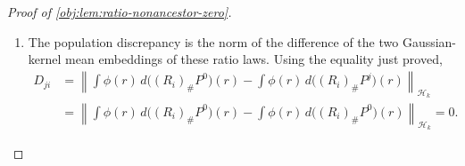 \begin{proof}[Proof of \cref{obj:lem:ratio-nonancestor-zero}]
\begin{enumerate}
\[
\int_{[0,1]^{[n]\setminus\mathcal A_i}}
\Gamma_i^0(\mathfrak a,\mathfrak b)\,d\mathfrak b=1,
\qquad
\int_{[0,1]^{[n]\setminus\mathcal A_i}}
\Gamma_i^j(\mathfrak a,\mathfrak b)\,d\mathfrak b=1 .
\]
Consequently the two complement-marginal densities on \([0,1]^{\mathcal A_i}\) are the same:
\[
\int_{[0,1]^{[n]\setminus\mathcal A_i}}
p^0(\mathfrak a\oplus\mathfrak b)\,d\mathfrak b
=
\prod_{\ell\in\mathcal A_i}
 p_\ell\bigl(\mathfrak a_\ell\mid
 \mathfrak a_{\operatorname{pa}_G(\ell)}\bigr)
=
\int_{[0,1]^{[n]\setminus\mathcal A_i}}
p^{\pi(j)}(\mathfrak a\oplus\mathfrak b)\,d\mathfrak b .
\]
Thus the projected latent laws agree:
\[
(\operatorname{pr}_{\mathcal A_i})_\#\mu^0
=
(\operatorname{pr}_{\mathcal A_i})_\#\mu^{\pi(j)} .
\]
Since \(\{\pi(i)\}\cup\operatorname{pa}_G(\pi(i))\subseteq\mathcal A_i\), the ratio map \(\rho_i\) factors through this projection.  Explicitly, the map \(\widetilde\rho_i:[0,1]^{\mathcal A_i}\to\mathbb R\) defined by
\[
\widetilde\rho_i(\mathfrak a)
=
\frac{q_{\pi(i)}(\mathfrak a_{\pi(i)})}
{p_{\pi(i)}(\mathfrak a_{\pi(i)}\mid
\mathfrak a_{\operatorname{pa}_G(\pi(i))})}
\]
satisfies \(\rho_i=\widetilde\rho_i\circ\operatorname{pr}_{\mathcal A_i}\).  Pushing the projected-law identity forward by \(\widetilde\rho_i\) gives
\[
(\rho_i)_\#\mu^0=(\rho_i)_\#\mu^{\pi(j)},
\]
and hence, by the ratio-law identifications in the preceding step,
\[
(R_i)_\#P^0=(R_i)_\#P^j .
\]

\item The population discrepancy is the norm of the difference of the two Gaussian-kernel mean embeddings of these ratio laws.  Using the equality just proved,
\[
\begin{aligned}
D_{ji}
&=
\left\|
\int \phi(r)\,d\bigl((R_i)_\#P^0\bigr)(r)
-
\int \phi(r)\,d\bigl((R_i)_\#P^j\bigr)(r)
\right\|_{\mathcal H_k}  \\
&=
\left\|
\int \phi(r)\,d\bigl((R_i)_\#P^0\bigr)(r)
-
\int \phi(r)\,d\bigl((R_i)_\#P^0\bigr)(r)
\right\|_{\mathcal H_k}
=0 .
\end{aligned}
\]
\end{enumerate}
\end{proof}
